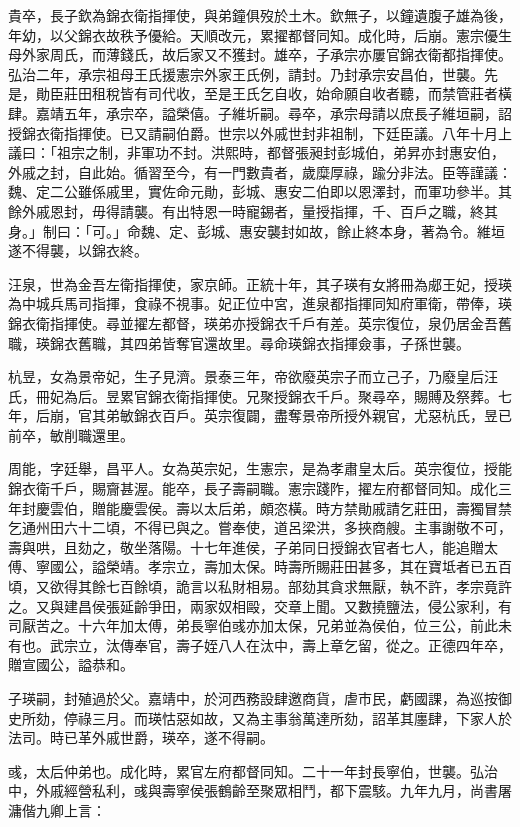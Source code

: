 \begin{pinyinscope}
貴卒，長子欽為錦衣衛指揮使，與弟鐘俱歿於土木。欽無子，以鐘遺腹子雄為後，年幼，以父錦衣故秩予優給。天順改元，累擢都督同知。成化時，后崩。憲宗優生母外家周氏，而薄錢氏，故后家又不獲封。雄卒，子承宗亦屢官錦衣衛都指揮使。弘治二年，承宗祖母王氏援憲宗外家王氏例，請封。乃封承宗安昌伯，世襲。先是，勛臣莊田租稅皆有司代收，至是王氏乞自收，始命願自收者聽，而禁管莊者橫肆。嘉靖五年，承宗卒，謚榮僖。子維圻嗣。尋卒，承宗母請以庶長子維垣嗣，詔授錦衣衛指揮使。已又請嗣伯爵。世宗以外戚世封非祖制，下廷臣議。八年十月上議曰：「祖宗之制，非軍功不封。洪熙時，都督張昶封彭城伯，弟昇亦封惠安伯，外戚之封，自此始。循習至今，有一門數貴者，歲糜厚祿，踰分非法。臣等謹議：魏、定二公雖係戚里，實佐命元勛，彭城、惠安二伯即以恩澤封，而軍功參半。其餘外戚恩封，毋得請襲。有出特恩一時寵錫者，量授指揮，千、百戶之職，終其身。」制曰：「可。」命魏、定、彭城、惠安襲封如故，餘止終本身，著為令。維垣遂不得襲，以錦衣終。

汪泉，世為金吾左衛指揮使，家京師。正統十年，其子瑛有女將冊為郕王妃，授瑛為中城兵馬司指揮，食祿不視事。妃正位中宮，進泉都指揮同知府軍衛，帶俸，瑛錦衣衛指揮使。尋並擢左都督，瑛弟亦授錦衣千戶有差。英宗復位，泉仍居金吾舊職，瑛錦衣舊職，其四弟皆奪官還故里。尋命瑛錦衣指揮僉事，子孫世襲。

杭昱，女為景帝妃，生子見濟。景泰三年，帝欲廢英宗子而立己子，乃廢皇后汪氏，冊妃為后。昱累官錦衣衛指揮使。兄聚授錦衣千戶。聚尋卒，賜賻及祭葬。七年，后崩，官其弟敏錦衣百戶。英宗復闢，盡奪景帝所授外親官，尤惡杭氏，昱已前卒，敏削職還里。

周能，字廷舉，昌平人。女為英宗妃，生憲宗，是為孝肅皇太后。英宗復位，授能錦衣衛千戶，賜齎甚渥。能卒，長子壽嗣職。憲宗踐阼，擢左府都督同知。成化三年封慶雲伯，贈能慶雲侯。壽以太后弟，頗恣橫。時方禁勛戚請乞莊田，壽獨冒禁乞通州田六十二頃，不得已與之。嘗奉使，道呂梁洪，多挾商艘。主事謝敬不可，壽與哄，且劾之，敬坐落陽。十七年進侯，子弟同日授錦衣官者七人，能追贈太傅、寧國公，謚榮靖。孝宗立，壽加太保。時壽所賜莊田甚多，其在寶坻者已五百頃，又欲得其餘七百餘頃，詭言以私財相易。部劾其貪求無厭，執不許，孝宗竟許之。又與建昌侯張延齡爭田，兩家奴相毆，交章上聞。又數撓鹽法，侵公家利，有司厭苦之。十六年加太傅，弟長寧伯彧亦加太保，兄弟並為侯伯，位三公，前此未有也。武宗立，汰傳奉官，壽子姪八人在汰中，壽上章乞留，從之。正德四年卒，贈宣國公，謚恭和。

子瑛嗣，封殖過於父。嘉靖中，於河西務設肆邀商貨，虐市民，虧國課，為巡按御史所劾，停祿三月。而瑛怙惡如故，又為主事翁萬達所劾，詔革其廛肆，下家人於法司。時已革外戚世爵，瑛卒，遂不得嗣。

彧，太后仲弟也。成化時，累官左府都督同知。二十一年封長寧伯，世襲。弘治中，外戚經營私利，彧與壽寧侯張鶴齡至聚眾相鬥，都下震駭。九年九月，尚書屠滽偕九卿上言：


\end{pinyinscope}
